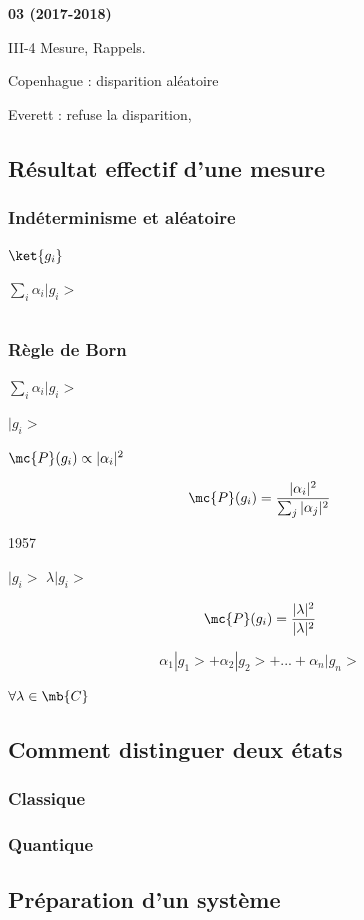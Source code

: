 
{\bf 03 (2017-2018)}

 III-4 Mesure, Rappels.

Copenhague : disparition aléatoire

Everett : refuse la disparition,

\subsection{Résultat effectif d'une mesure} %
\subsubsection{Indéterminisme et aléatoire} %

$\ket{g_i}$

$\sum_i\alpha_i|g_i>$

\[
\]

\subsubsection{Règle de Born} %

$\sum_i\alpha_i|g_i>$

$|g_i>$

$\mc{P}(g_i) \propto |\alpha_i|^2$

\[
\mc{P}(g_i)=\frac{|\alpha_i|^2}{\sum_j|\alpha_j|^2}
\]

1957

$|g_i>$ $\lambda|g_i>$

\[
\mc{P}(g_i)=\frac{|\lambda|^2}{|\lambda|^2}
\]

\[
\alpha_1|g_1>+\alpha_2|g_2>+...+\alpha_n|g_n>
\]

$\forall\lambda\in\mb{C}$

\subsection{Comment distinguer deux états} %
\subsubsection{Classique} %
\subsubsection{Quantique} %

\subsection{Préparation d'un système} %

